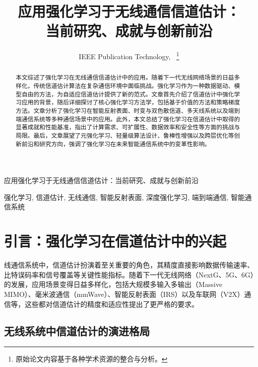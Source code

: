\documentclass[journal]{IEEEtran}
\begin{document}
\title{应用强化学习于无线通信信道估计：\\当前研究、成就与创新前沿}

\author{IEEE Publication Technology,~
\thanks{原始论文内容基于各种学术资源的整合与分析。}}

%
{应用强化学习于无线通信信道估计：当前研究、成就与创新前沿}

\maketitle

\begin{abstract}
本文综述了强化学习在无线通信信道估计中的应用。随着下一代无线网络场景的日益多样化，传统信道估计算法在复杂通信环境中面临挑战。强化学习作为一种数据驱动、模型自由的方法，为自适应信道估计提供了新的范式。文章首先介绍了信道估计中强化学习应用的背景，随后详细探讨了核心强化学习方法学，包括基于价值的方法和策略梯度方法。文章分析了强化学习在智能反射表面、时变与双色散信道、多天线系统以及端到端通信系统等多种通信场景中的应用。此外，本文总结了强化学习在信道估计中取得的显著成就和性能基准，指出了计算需求、可扩展性、数据效率和安全性等方面的挑战与局限。最后，文章展望了元强化学习、轻量级算法设计、鲁棒性增强以及跨层优化等创新前沿和研究方向，强调了强化学习在未来智能通信系统中的变革性影响。
\end{abstract}

\begin{IEEEkeywords}
强化学习, 信道估计, 无线通信, 智能反射表面, 深度强化学习, 端到端通信, 智能通信系统
\end{IEEEkeywords}

\IEEEpeerreviewmaketitle

\section{引言：强化学习在信道估计中的兴起}

线通信系统中，信道估计扮演着至关重要的角色，其精度直接影响数据传输速率、比特误码率和信号覆盖等关键性能指标\cite{ref1}。随着下一代无线网络（NextG、5G、6G）的发展，应用场景变得日益多样化，包括大规模多输入多输出（Massive MIMO）、毫米波通信（mmWave）、智能反射表面（IRS）以及车联网（V2X）通信等，这些都对信道估计的精度和适应性提出了更严格的要求\cite{ref3}。

\subsection{无线系统中信道估计的演进格局}
\end{document}
